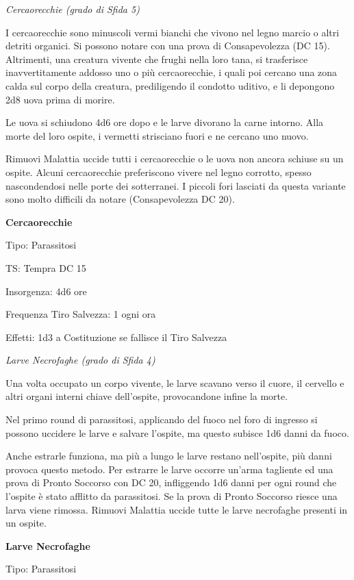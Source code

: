 \begin{multicols}{2}
\medskip
\noindent\emph{Cercaorecchie (grado di Sfida 5)}

I cercaorecchie sono minuscoli vermi bianchi che vivono nel legno marcio o altri detriti organici. Si possono notare con una prova di Consapevolezza (DC 15). Altrimenti, una creatura vivente che frughi nella loro tana, si trasferisce inavvertitamente addosso uno o più cercaorecchie, i quali poi cercano una zona calda sul corpo della creatura, prediligendo il condotto uditivo, e li depongono 2d8 uova prima di morire.

Le uova si schiudono 4d6 ore dopo e le larve divorano la carne intorno. Alla morte del loro ospite, i vermetti strisciano fuori e ne cercano uno nuovo.

Rimuovi Malattia uccide tutti i cercaorecchie o le uova non ancora schiuse su un ospite. Alcuni cercaorecchie preferiscono vivere nel legno corrotto, spesso nascondendosi nelle porte dei sotterranei. I piccoli fori lasciati da questa variante sono molto difficili da notare (Consapevolezza DC 20).

\medskip
\textbf{Cercaorecchie}

Tipo: Parassitosi

TS: Tempra DC 15

Insorgenza: 4d6 ore

Frequenza Tiro Salvezza: 1 ogni ora

Effetti: 1d3 a Costituzione se fallisce il Tiro Salvezza

\medskip
\noindent\emph{Larve Necrofaghe (grado di Sfida 4)}

Una volta occupato un corpo vivente, le larve scavano verso il cuore, il cervello e altri organi interni chiave dell'ospite, provocandone infine la morte.

Nel primo round di parassitosi, applicando del fuoco nel foro di ingresso si possono uccidere le larve e salvare l'ospite, ma questo subisce 1d6 danni da fuoco.

Anche estrarle funziona, ma più a lungo le larve restano nell'ospite, più danni provoca questo metodo. Per estrarre le larve occorre un'arma tagliente ed una prova di Pronto Soccorso con DC 20, infliggendo 1d6 danni per ogni round che l'ospite è stato afflitto da parassitosi. Se la prova di Pronto Soccorso riesce una larva viene rimossa. Rimuovi Malattia uccide tutte le larve necrofaghe presenti in un ospite.

\medskip
\textbf{Larve Necrofaghe}

Tipo: Parassitosi


\end{multicols}
